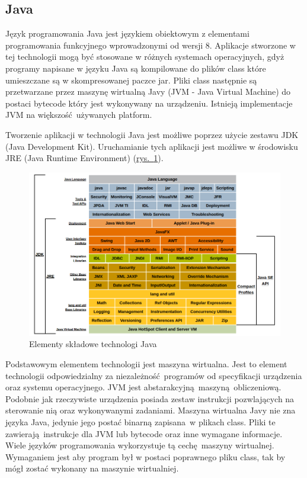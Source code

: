 \subsection{Java}
Język programowania Java jest językiem obiektowym z elementami programowania funkcyjnego wprowadzonymi od wersji 8. Aplikacje stworzone w tej technologii mogą być stosowane w różnych systemach operacyjnych, gdyż programy napisane w języku Java są kompilowane do plików class które umieszczane są w skompresowanej paczce jar. Pliki class następnie są przetwarzane przez maszynę wirtualną Javy (JVM - Java Virtual Machine) do postaci bytecode który jest wykonywany na urządzeniu. Istnieją implementacje JVM na większość używanych platform.

Tworzenie aplikacji w technologii Java jest możliwe poprzez użycie zestawu JDK (Java Development Kit). Uruchamianie tych aplikacji jest możliwe w środowisku JRE (Java Runtime Environment)  (\hyperref[fig:java_arch]{rys.~\ref*{fig:java_arch}}).

\begin{figure}[h]
  \center
  \includegraphics[scale=0.4]{../image/java_arch.png}
  \caption{Elementy składowe technologi Java \cite{OracleJavaArch}}
  \label{fig:java_arch}
\end{figure}

Podstawowym elementem technologii jest maszyna wirtualna. Jest to element technologii odpowiedzialny za niezależność programów od specyfikacji urządzenia oraz systemu operacyjnego. JVM jest abstarakcyjną maszyną obliczeniową. Podobnie jak rzeczywiste urządzenia posiada zestaw instrukcji pozwlających na sterowanie nią oraz wykonywanymi zadaniami. Maszyna wirtualna Javy nie zna języka Java, jedynie jego postać binarną zapisana w plikach class. Pliki te zawierają instrukcje dla JVM lub bytecode oraz inne wymagane informacje. Wiele języków programowania wykorzystuje tą cechę maszyny wirtualnej. Wymaganiem jest aby program był w postaci poprawnego pliku class, tak by mógł zostać wykonany na maszynie wirtualniej.

